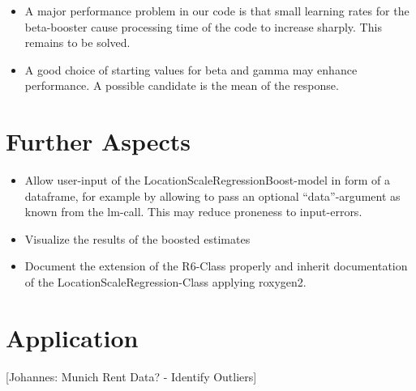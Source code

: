 \documentclass[
]{report}
\providecommand{\tightlist}{%
  \setlength{\itemsep}{0pt}\setlength{\parskip}{0pt}}
\begin{document}
\begin{itemize}
\tightlist
\item
  A major performance problem in our code is that small learning rates
  for the beta-booster cause processing time of the code to increase
  sharply. This remains to be solved.
\item
  A good choice of starting values for beta and gamma may enhance
  performance. A possible candidate is the mean of the response.
\end{itemize}

\hypertarget{further-aspects}{%
\section{Further Aspects}\label{further-aspects}}

\begin{itemize}
\item
  Allow user-input of the LocationScaleRegressionBoost-model in form of
  a dataframe, for example by allowing to pass an optional
  ``data''-argument as known from the lm-call. This may reduce proneness
  to input-errors.
\item
  Visualize the results of the boosted estimates
\item
  Document the extension of the R6-Class properly and inherit
  documentation of the LocationScaleRegression-Class applying roxygen2.
\end{itemize}

\hypertarget{application}{%
\section{Application}\label{application}}

{[}Johannes: Munich Rent Data? - Identify Outliers{]}
\end{document}
